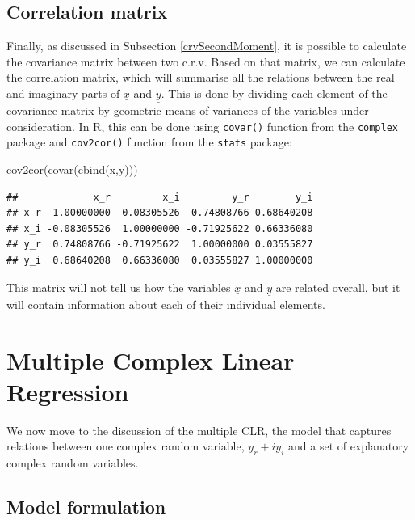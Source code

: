 \documentclass[
]{book}
\newenvironment{Shaded}{\begin{snugshade}}{\end{snugshade}}
\newcommand{\FunctionTok}[1]{\textcolor[rgb]{0.00,0.00,0.00}{#1}}
\newcommand{\NormalTok}[1]{#1}
\begin{document}
\hypertarget{correlation-matrix}{%
\section{Correlation matrix}\label{correlation-matrix}}

Finally, as discussed in Subsection \ref{crvSecondMoment}, it is possible to calculate the covariance matrix between two c.r.v. Based on that matrix, we can calculate the correlation matrix, which will summarise all the relations between the real and imaginary parts of \(\underline{x}\) and \(\underline{y}\). This is done by dividing each element of the covariance matrix by geometric means of variances of the variables under consideration. In R, this can be done using \texttt{covar()} function from the \texttt{complex} package and \texttt{cov2cor()} function from the \texttt{stats} package:

\begin{Shaded}
\begin{Highlighting}[]
\FunctionTok{cov2cor}\NormalTok{(}\FunctionTok{covar}\NormalTok{(}\FunctionTok{cbind}\NormalTok{(x,y)))}
\end{Highlighting}
\end{Shaded}

\begin{verbatim}
##             x_r         x_i         y_r        y_i
## x_r  1.00000000 -0.08305526  0.74808766 0.68640208
## x_i -0.08305526  1.00000000 -0.71925622 0.66336080
## y_r  0.74808766 -0.71925622  1.00000000 0.03555827
## y_i  0.68640208  0.66336080  0.03555827 1.00000000
\end{verbatim}

This matrix will not tell us how the variables \(\underline{x}\) and \(\underline{y}\) are related overall, but it will contain information about each of their individual elements.

\hypertarget{multipleCLR}{%
\chapter{Multiple Complex Linear Regression}\label{multipleCLR}}

We now move to the discussion of the multiple CLR, the model that captures relations between one complex random variable, \(y_r + i y_i\) and a set of explanatory complex random variables.

\hypertarget{model-formulation}{%
\section{Model formulation}\label{model-formulation}}
\end{document}
